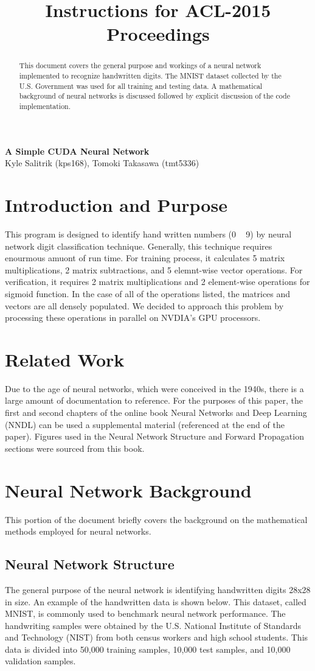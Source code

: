 \documentclass[11pt]{article}
\title{Instructions for ACL-2015 Proceedings}
\begin{document}
\begin{center}
	\textbf{\large{A Simple CUDA Neural Network}}\\
	Kyle Salitrik (kps168), Tomoki Takasawa (tmt5336)
\end{center}
\begin{abstract}
	This document covers the general purpose and workings of a neural network implemented to recognize handwritten digits. The MNIST dataset collected by the U.S. Government was used for all training and testing data. A mathematical background of neural networks is discussed followed by explicit discussion of the code implementation.
\end{abstract}

\section{Introduction and Purpose}
This program is designed to identify hand written numbers (0 ~ 9) by neural network digit classification technique. Generally, this technique requires enourmous amuont of run time. For training process, it calculates 5 matrix multiplications, 2 matrix subtractions, and 5 elemnt-wise vector operations. For verification, it requires 2 matrix multiplications and 2 element-wise operations for sigmoid function. In the case of all of the operations listed, the matrices and vectors are all densely populated. We decided to approach this problem by processing these operations in parallel on NVDIA's GPU processors. 

\section{Related Work}
Due to the age of neural networks, which were conceived in the 1940s, there is a large amount of documentation to reference. For the purposes of this paper, the first and second chapters of the online book Neural Networks and Deep Learning (NNDL) can be used a supplemental material (referenced at the end of the paper). Figures used in the Neural Network Structure and Forward Propagation sections were sourced from this book.

\section{Neural Network Background}
This portion of the document briefly covers the background on the mathematical methods employed for neural networks.

\subsection{Neural Network Structure}
The general purpose of the neural network is identifying handwritten digits 28x28 in size. An example of the handwritten data is shown below. This dataset, called MNIST, is commonly used to benchmark neural network performance. The handwriting samples were obtained by the U.S. National Institute of Standards and Technology (NIST) from both census workers and high school students. This data is divided into 50,000 training samples, 10,000 test samples, and 10,000 validation samples.
\end{document}
